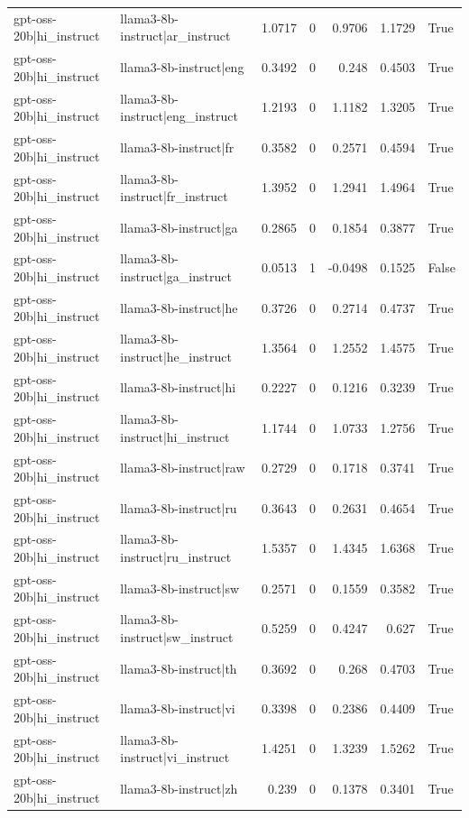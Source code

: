 \begin{table}
\begin{tabular}{l l r r r r l}
gpt-oss-20b|hi_instruct & llama3-8b-instruct|ar_instruct & 1.0717 & 0 & 0.9706 & 1.1729 & True \\
gpt-oss-20b|hi_instruct & llama3-8b-instruct|eng & 0.3492 & 0 & 0.248 & 0.4503 & True \\
gpt-oss-20b|hi_instruct & llama3-8b-instruct|eng_instruct & 1.2193 & 0 & 1.1182 & 1.3205 & True \\
gpt-oss-20b|hi_instruct & llama3-8b-instruct|fr & 0.3582 & 0 & 0.2571 & 0.4594 & True \\
gpt-oss-20b|hi_instruct & llama3-8b-instruct|fr_instruct & 1.3952 & 0 & 1.2941 & 1.4964 & True \\
gpt-oss-20b|hi_instruct & llama3-8b-instruct|ga & 0.2865 & 0 & 0.1854 & 0.3877 & True \\
gpt-oss-20b|hi_instruct & llama3-8b-instruct|ga_instruct & 0.0513 & 1 & -0.0498 & 0.1525 & False \\
gpt-oss-20b|hi_instruct & llama3-8b-instruct|he & 0.3726 & 0 & 0.2714 & 0.4737 & True \\
gpt-oss-20b|hi_instruct & llama3-8b-instruct|he_instruct & 1.3564 & 0 & 1.2552 & 1.4575 & True \\
gpt-oss-20b|hi_instruct & llama3-8b-instruct|hi & 0.2227 & 0 & 0.1216 & 0.3239 & True \\
gpt-oss-20b|hi_instruct & llama3-8b-instruct|hi_instruct & 1.1744 & 0 & 1.0733 & 1.2756 & True \\
gpt-oss-20b|hi_instruct & llama3-8b-instruct|raw & 0.2729 & 0 & 0.1718 & 0.3741 & True \\
gpt-oss-20b|hi_instruct & llama3-8b-instruct|ru & 0.3643 & 0 & 0.2631 & 0.4654 & True \\
gpt-oss-20b|hi_instruct & llama3-8b-instruct|ru_instruct & 1.5357 & 0 & 1.4345 & 1.6368 & True \\
gpt-oss-20b|hi_instruct & llama3-8b-instruct|sw & 0.2571 & 0 & 0.1559 & 0.3582 & True \\
gpt-oss-20b|hi_instruct & llama3-8b-instruct|sw_instruct & 0.5259 & 0 & 0.4247 & 0.627 & True \\
gpt-oss-20b|hi_instruct & llama3-8b-instruct|th & 0.3692 & 0 & 0.268 & 0.4703 & True \\
gpt-oss-20b|hi_instruct & llama3-8b-instruct|vi & 0.3398 & 0 & 0.2386 & 0.4409 & True \\
gpt-oss-20b|hi_instruct & llama3-8b-instruct|vi_instruct & 1.4251 & 0 & 1.3239 & 1.5262 & True \\
gpt-oss-20b|hi_instruct & llama3-8b-instruct|zh & 0.239 & 0 & 0.1378 & 0.3401 & True \\

\end{tabular}
\end{table}
